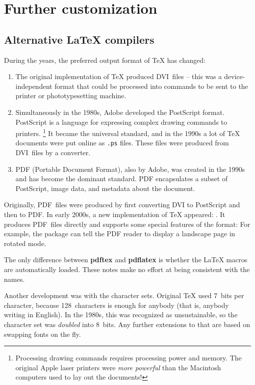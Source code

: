 \chapter{Further customization}

\section{Alternative \LaTeX{} compilers}

During the years, the preferred output format of \TeX{} has changed:
\begin{enumerate}
\item The original implementation of \TeX{} produced DVI~files
    -- this was a device-independent format that could be processed into commands
    to be sent to the printer or photo\-type\-setting machine.
\item Simultaneously in the 1980s, Adobe developed the PostScript format.
    PostScript is a language for expressing complex drawing commands to printers.%
\footnote{Processing drawing commands requires processing power and memory.
The original Apple laser printers were \emph{more powerful} than the
Macintosh computers used to lay out the documents!}
    It became the universal standard,
    and in the 1990s a lot of \TeX{} documents were put online as \verb|.ps| files.
    These files were produced from DVI~files by a converter.
\item PDF (Portable Document Format), also by Adobe,
    was created in the 1990s and has become the dominant standard.
    PDF encapsulates a subset of PostScript, image data, and metadata about the document.
\end{enumerate}

Originally, PDF~files were produced by first converting DVI to PostScript and then to PDF.
In early 2000s, a new implementation of \TeX{} appeared: .
It produces PDF~files directly and supports some special features of the format:
For example, the  package can tell the PDF reader
to display a landscape page in rotated mode.

\begin{technote}
The only difference between \textbf{pdftex} and \textbf{pdflatex}
is whether the \LaTeX{} macros are automatically loaded.
These notes make no effort at being consistent with the names.
\end{technote}


Another development was with the character sets.
Original \TeX{} used 7~bits per character, because 128~characters is enough for anybody
(that is, anybody writing in English).
In the 1980s, this was recognized as unsustainable,
so the character set was \emph{doubled} into 8~bits.
Any further extensions to that are based on swapping fonts on the fly.

